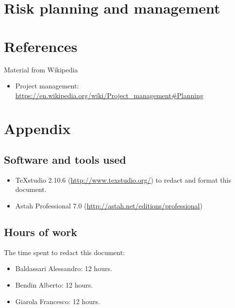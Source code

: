 \documentclass[a4paper,11pt]{report} %
\begin{document}
	
	\pagebreak
	\section{Risk planning and management}	

	\pagebreak
	\section{References}
		Material from Wikipedia
		\begin{itemize}
			\item Project management: \href{https://en.wikipedia.org/wiki/Project\_management\#Planning}{https://en.wikipedia.org/wiki/Project\_management\#Planning}
		\end{itemize}
	
	\section{Appendix}
		\subsection{Software and tools used}
		\begin{itemize}
			\item TeXstudio 2.10.6 (\href{http://www.texstudio.org/}{http://www.texstudio.org/}) to redact and format this document.
			\item Astah Professional 7.0 (\href{http://astah.net/editions/professional}{http://astah.net/editions/professional}) 
		\end{itemize}
		
		\subsection{Hours of work} The time spent to redact this document:
		\begin{itemize}
			\item Baldassari Alessandro: 12 hours.
			\item Bendin Alberto: 12 hours.
			\item Giarola Francesco: 12 hours.
		\end{itemize}
\end{document}
